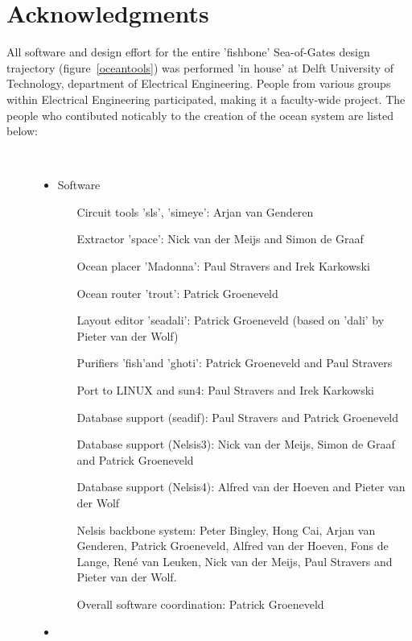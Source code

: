 
\chapter{Acknowledgments}
All software and design effort for the entire 'fishbone' Sea-of-Gates design
trajectory (figure~\ref{oceantools}) was performed 'in house' at Delft
University of Technology, department of Electrical Engineering. People from
various groups within Electrical Engineering participated, making it a
faculty-wide project. The people who contibuted noticably to the creation of
the ocean system are listed below:

\begin{description}
\item[~]
\begin{itemize}
\item
{\sc Software}
\begin{itemize}
\item[Circuit tools 'sls', 'simeye':]
Arjan van Genderen 
\item[Extractor 'space':]
Nick van der Meijs and Simon de Graaf
\item[Ocean placer 'Madonna':]
Paul Stravers and Irek Karkowski
\item[Ocean router 'trout':]
Patrick Groeneveld
\item[Layout editor 'seadali':]
Patrick Groeneveld (based on 'dali' by Pieter van der Wolf)
\item[Purifiers 'fish'and 'ghoti':]
Patrick Groeneveld and Paul Stravers
\item[Port to {\sc LINUX} and sun4:]
Paul Stravers and Irek Karkowski
\item[Database support (seadif):]
Paul Stravers and Patrick Groeneveld
\item[Database support (Nelsis3):]
Nick van der Meijs, Simon de Graaf and Patrick Groeneveld
\item[Database support (Nelsis4):]
Alfred van der Hoeven and Pieter van der Wolf
\item[Nelsis backbone system:]
Peter Bingley, Hong Cai, Arjan van Genderen, Patrick Groeneveld, Alfred van der
Hoeven, Fons de Lange, Ren\'e van Leuken, Nick van der Meijs, Paul Stravers and
Pieter van der Wolf.
\item[Overall software coordination:]
Patrick Groeneveld 
\end{itemize}
\item

\end{itemize}
\end{description}
